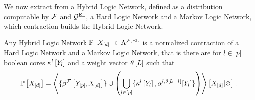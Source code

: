 We now extract from a Hybrid Logic Network, defined as a distribution computable by $\mathcal{F}$ and $\mathcal{G}^{\mathrm{EL}}$, a Hard Logic Network and a Markov Logic Network, which contraction builds the Hybrid Logic Network.

\begin{theorem}
    Any Hybrid Logic Network $\mathbb{P}\left[X_{[d]}\right]\in\Lambda^{\mathcal{F},\mathrm{EL}}$ is a normalized contraction of a Hard Logic Network and a Markov Logic Network, that is there are for $l\in[p]$ boolean cores $\kappa^{l}\left[Y_{l}\right]$ and a weight vector $\theta\left[L\right]$ such that
    \begin{align*}
        \mathbb{P}\left[X_{[d]}\right] =
        \left\langle 
            \{\beta^{\mathcal{F}}\left[Y_{[p]},X_{[d]}\right]\}
            \cup \left(\bigcup_{l\in[p]}\{\kappa^{l}\left[Y_{l}\right],\alpha^{l,\theta\left[L_{}=l_{}\right]}[Y_{l}]\}\right)
        \right\rangle \left[ X_{[d]} | \varnothing \right] \, .
    \end{align*}
\end{theorem}
